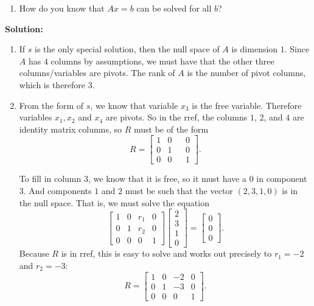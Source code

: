 \documentclass[11pt]{article}
\begin{document}
\begin{enumerate}
\begin{enumerate}
\item How do you know that $Ax = b$ can be solved for all $b$?

\end{enumerate}

\textbf{Solution:}  

\begin{enumerate}

\item If $s$ is the only special solution, then the null space of $A$ is dimension $1$.  Since $A$ has $4$ columns by assumptions, we must have that the other three columns/variables are pivots.  The rank of $A$ is the number of pivot columns, which is therefore $3$.

\item From the form of $s$, we know that variable $x_3$ is the free variable.  Therefore variables $x_1, x_2$ and $x_4$ are pivots.  So in the rref, the columns $1$, $2$, and $4$ are identity matrix columns, so $R$ must be of the form
\[R = \begin{bmatrix} 1 & 0 & & 0 \\ 0 & 1 & & 0 \\ 0 & 0 & & 1 \end{bmatrix}. \]

To fill in column $3$, we know that it is free, so it must have a $0$ in component $3$.  And components $1$ and $2$ must be such that the vector $(2,3,1,0)$ is in the null space.  That is, we must solve the equation
\[\begin{bmatrix} 1 & 0 & r_1 & 0 \\ 0 & 1 &r_2 & 0 \\ 0 & 0 & 0 & 1 \end{bmatrix} \begin{bmatrix} 2 \\ 3 \\ 1 \\ 0 \end{bmatrix} = \begin{bmatrix} 0 \\ 0 \\ 0 \end{bmatrix}. \]
Because $R$ is in rref, this is easy to solve and works out precisely to $r_1 = -2$ and $r_2 = -3$:
\[R = \begin{bmatrix} 1 & 0 & -2 & 0 \\ 0 & 1 &-3  & 0 \\ 0 & 0 &0 & 1 \end{bmatrix}. \]


\end{enumerate}
\end{enumerate}
\end{document}
